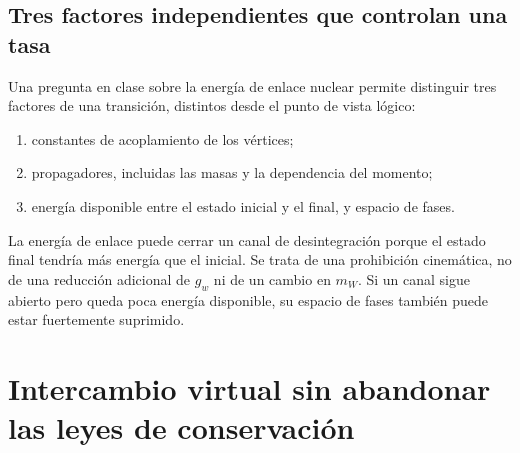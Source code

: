 \subsection{Tres factores independientes que controlan una tasa}

Una pregunta en clase sobre la energía de enlace nuclear permite distinguir tres factores de una transición, distintos desde el punto de vista lógico:
\begin{enumerate}
  \item constantes de acoplamiento de los vértices;
  \item propagadores, incluidas las masas y la dependencia del momento;
  \item energía disponible entre el estado inicial y el final, y espacio de fases.
\end{enumerate}
La energía de enlace puede cerrar un canal de desintegración porque el estado final tendría más energía que el inicial. Se trata de una prohibición cinemática, no de una reducción adicional de \(g_w\) ni de un cambio en \(m_W\). Si un canal sigue abierto pero queda poca energía disponible, su espacio de fases también puede estar fuertemente suprimido.

\begin{classroomqa}
\end{classroomqa}

\begin{classroomqa}
\end{classroomqa}

\section{Intercambio virtual sin abandonar las leyes de conservación}

